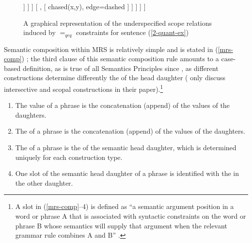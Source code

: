 \documentclass[output=paper]{langsci/langscibook}
\begin{document}
\begin{figure}
\begin{forest}
[ top
[ {chased(x,y)}, edge=dashed
	[ every, no edge
		[ dog(x), edge=dashed ]
		[ {}, no edge 
				[ some(y), no edge 
					[ cat (y), edge=dashed ] 
					[ {}, [ {chased(x,y)}, edge=dashed	 ] ] ] ] 
		[ {}, [ {chased(x,y)}, edge=dashed ] ]			
					] 
	]
	]
\end{forest}
\caption{\label{fig:MRS-tree}A graphical representation of the underspecified scope relations induced by $=_{qeq}$ constraints for sentence (\ref{2-quant-ex})}
\end{figure}

Semantic composition within MRS is relatively simple and is stated in (\ref{mrs-comp}) \citep[313--314]{Copestakeetal2005}; the third clause of this semantic composition rule amounts to a case-based definition, as is true of all Semantics Principles  since \citet{PollardandSag1987}, as different constructions determine differently the  of the head daughter (\citealt{Copestakeetal2005} only discuss intersective and scopal constructions in their paper).\footnote{A slot in (\ref{mrs-comp}--4) is defined as ``a semantic argument position in a word or phrase A that is associated with syntactic constraints on the word or phrase B whose semantics will supply that argument when the relevant grammar rule combines A and B'' \citep[313]{Copestakeetal2005}.}

\begin{exe}
\ex\label{mrs-comp}
\begin{enumerate}
\item The  value of a phrase is the concatenation (append) of the 
values of the daughters.
\item The  of a phrase is the concatenation (append) of the  values of the daughters.
\item The  of a phrase is the  of the semantic head daughter, which is determined uniquely for each construction type.
\item One slot of the semantic head daughter of a phrase is identified with the  in the other daughter. 
\end{enumerate}
\end{exe}
\end{document}

